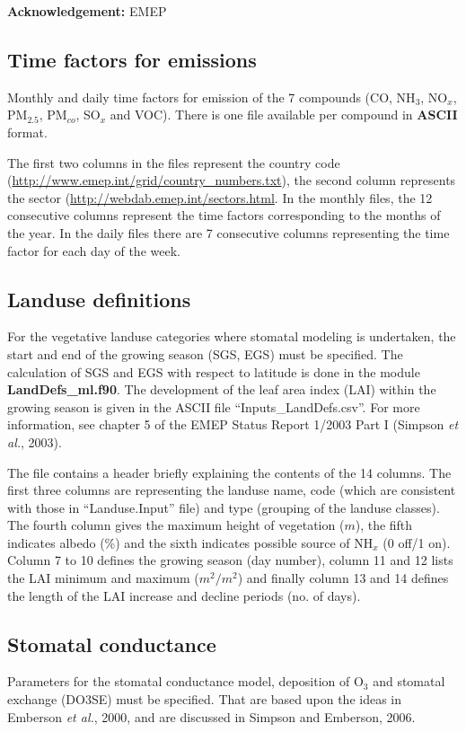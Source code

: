 {\bf Acknowledgement:} EMEP

\subsection{Time factors for emissions}

Monthly and daily time factors for emission of the 7 compounds 
(CO, NH$_{3}$, NO$_{x}$, PM$_{2.5}$, PM$_{co}$, SO$_{x}$ and VOC). 
There is one file available per compound in {\bf ASCII} format. 

The first two columns in the files represent the country code
(\url{http://www.emep.int/grid/country_numbers.txt}), the second column 
represents the sector (\url{http://webdab.emep.int/sectors.html}. In the monthly files, 
the 12 consecutive columns represent the time factors corresponding to 
the months of the year. In the daily files there are 7 consecutive columns representing 
the time factor for each day of the week. 

\subsection{Landuse definitions}
For the vegetative landuse categories where stomatal modeling is
undertaken, the start and end of the growing season (SGS, EGS) must be specified. 
The calculation of SGS and EGS with respect to latitude is done 
in the module {\bf LandDefs\_ml.f90}. 
The development of the leaf area index (LAI) within the growing season
is given in the ASCII file ``Inputs\_LandDefs.csv''. 
For more information, see chapter 5  of the EMEP Status Report 1/2003 Part I (Simpson {\sl et al.}, 2003).


The file contains a header briefly explaining the contents of the 
14 columns. 
The first three columns are representing the landuse name, code (which
are consistent with those in ``Landuse.Input'' file) and
type (grouping of the landuse classes). The fourth column gives
the maximum height of vegetation ($m$), the fifth indicates albedo (\%) and
the sixth indicates possible source of NH$_{x}$ (0 off/1 on). Column 7 to 10
defines the growing season (day number), column 11 and 12 lists the
LAI minimum  and maximum ($m^{2}/m^{2}$) and finally column 13 and 14
defines the length of the LAI increase and decline periods (no. of days).


\subsection{Stomatal conductance}
Parameters for the stomatal conductance model, deposition of O$_{3}$ and
stomatal exchange (DO3SE) must be specified. That are based upon the ideas in
Emberson {\sl et al.}, 2000, and are discussed in Simpson and Emberson,
2006.  

